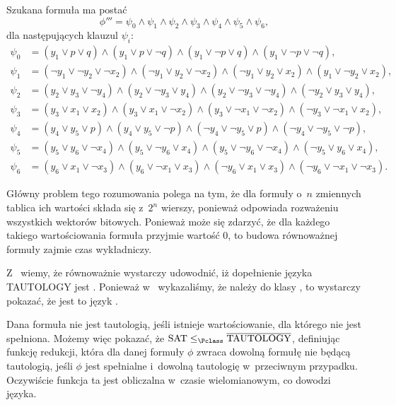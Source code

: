 
\exercise %
\exercise %
Szukana formuła  ma postać
\[
	\phi''' = \psi_0\wedge\psi_1\wedge\psi_2\wedge\psi_3\wedge\psi_4\wedge\psi_5\wedge\psi_6,
\]
dla następujących klauzul $\psi_i$:
\begin{align*}
	\psi_0 &= (y_1\vee p\vee q)\wedge(y_1\vee p\vee\neg q)\wedge(y_1\vee\neg p\vee q)\wedge(y_1\vee\neg p\vee\neg q), \\
	\psi_1 &= (\neg y_1\vee\neg y_2\vee\neg x_2)\wedge(\neg y_1\vee y_2\vee\neg x_2)\wedge(\neg y_1\vee y_2\vee x_2)\wedge(y_1 \vee\neg y_2\vee x_2), \\
	\psi_2 &= (y_2\vee y_3\vee\neg y_4)\wedge(y_2\vee\neg y_3\vee y_4)\wedge(y_2\vee\neg y_3\vee\neg y_4)\wedge(\neg y_2\vee y_3\vee y_4), \\
	\psi_3 &= (y_3\vee x_1\vee x_2)\wedge(y_3\vee x_1\vee\neg x_2)\wedge(y_3\vee\neg x_1\vee\neg x_2)\wedge(\neg y_3\vee\neg x_1\vee x_2), \\
	\psi_4 &= (y_4\vee y_5\vee p)\wedge(y_4\vee y_5\vee\neg p)\wedge(\neg y_4\vee\neg y_5\vee p)\wedge(\neg y_4\vee\neg y_5\vee\neg p), \\
	\psi_5 &= (y_5\vee y_6\vee\neg x_4)\wedge(y_5\vee\neg y_6\vee x_4)\wedge(y_5\vee\neg y_6\vee\neg x_4)\wedge(\neg y_5\vee y_6\vee x_4), \\
	\psi_6 &= (y_6\vee x_1\vee\neg x_3)\wedge(y_6\vee\neg x_1\vee x_3)\wedge(\neg y_6\vee x_1\vee x_3)\wedge(\neg y_6\vee\neg x_1\vee\neg x_3).
\end{align*}

\exercise %
Główny problem tego rozumowania polega na tym, że dla formuły o~$n$ zmiennych tablica ich wartości składa się z~$2^n$ wierszy, ponieważ odpowiada rozważeniu wszystkich  wektorów bitowych.
Ponieważ może się zdarzyć, że dla każdego takiego wartościowania formuła przyjmie wartość 0, to budowa równoważnej formuły  zajmie czas wykładniczy.

\exercise %
Z~ wiemy, że równoważnie wystarczy udowodnić, iż dopełnienie języka TAUTOLOGY jest .
Ponieważ w~ wykazaliśmy, że należy do klasy \NPclass, to wystarczy pokazać, że jest to język .

Dana formuła nie jest tautologią, jeśli istnieje wartościowanie, dla którego nie jest spełniona.
Możemy więc pokazać, że $\text{SAT}\le_\Pclass\overline{\text{TAUTOLOGY}}$, definiując funkcję redukcji, która dla danej formuły $\phi$ zwraca dowolną formułę nie będącą tautologią, jeśli $\phi$ jest spełnialne i~dowolną tautologię w~przeciwnym przypadku.
Oczywiście funkcja ta jest obliczalna w~czasie wielomianowym, co dowodzi  języka.


